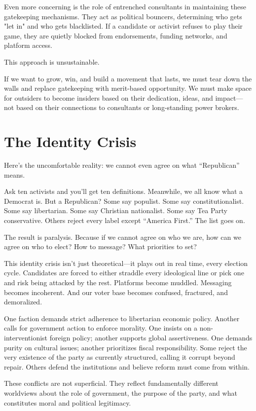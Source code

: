 Even more concerning is the role of entrenched consultants in maintaining these gatekeeping mechanisms. They act as political bouncers, determining who gets "let in" and who gets blacklisted. If a candidate or activist refuses to play their game, they are quietly blocked from endorsements, funding networks, and platform access.

This approach is unsustainable.

If we want to grow, win, and build a movement that lasts, we must tear down the walls and replace gatekeeping with merit-based opportunity. We must make space for outsiders to become insiders based on their dedication, ideas, and impact---not based on their connections to consultants or long-standing power brokers.

\section{The Identity Crisis}
Here’s the uncomfortable reality: we cannot even agree on what “Republican” means.

Ask ten activists and you’ll get ten definitions. Meanwhile, we all know what a Democrat is. But a Republican? Some say populist. Some say constitutionalist. Some say libertarian. Some say Christian nationalist. Some say Tea Party conservative. Others reject every label except “America First.” The list goes on.

The result is paralysis. Because if we cannot agree on who we are, how can we agree on who to elect? How to message? What priorities to set?

This identity crisis isn’t just theoretical—it plays out in real time, every election cycle. Candidates are forced to either straddle every ideological line or pick one and risk being attacked by the rest. Platforms become muddled. Messaging becomes incoherent. And our voter base becomes confused, fractured, and demoralized.

One faction demands strict adherence to libertarian economic policy. Another calls for government action to enforce morality. One insists on a non-interventionist foreign policy; another supports global assertiveness. One demands purity on cultural issues; another prioritizes fiscal responsibility. Some reject the very existence of the party as currently structured, calling it corrupt beyond repair. Others defend the institutions and believe reform must come from within.

These conflicts are not superficial. They reflect fundamentally different worldviews about the role of government, the purpose of the party, and what constitutes moral and political legitimacy.

